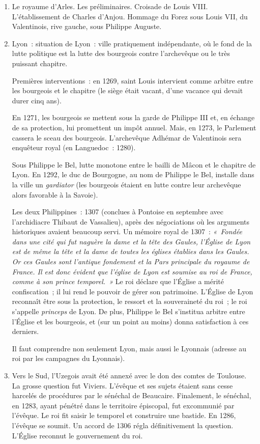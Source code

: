 \documentclass[french,twoside]{book} %
\begin{document}
\begin{enumerate}[itemsep=\baselineskip,]
\item Le royaume d’Arles. Les préliminaires. Croisade de Louis VIII. L’établissement de Charles d’Anjou. Hommage du Forez sous Louis VII, du Valentinois, rive gauche, sous Philippe Auguste.
\item  Lyon : situation de Lyon : ville pratiquement indépendante, où le fond de la lutte politique est la lutte des bourgeois contre l’archevêque ou le très puissant chapitre.\par
 Premières interventions : en 1269, saint Louis intervient comme arbitre entre les bourgeois et le chapitre (le siège était vacant, d’une vacance qui devait durer cinq ans).\par
 En 1271, les bourgeois se mettent sous la garde de Philippe III et, en échange de sa protection, lui promettent un impôt annuel. Mais, en 1273, le Parlement cassera le sceau des bourgeois. L’archevêque Adhémar de Valentinois sera enquêteur royal (en Languedoc : 1280).\par
 Sous Philippe le Bel, lutte monotone entre le bailli de Mâcon et le chapitre de Lyon. En 1292, le duc de Bourgogne, au nom de Philippe le Bel, installe dans la ville un {\itshape gardiator} (les bourgeois étaient en lutte contre leur archevêque alors favorable à la Savoie).\par
 Les deux Philippines : 1307 (conclues à Pontoise en septembre avec l’archidiacre Thibaut de Vassalieu), après des négociations où les arguments historiques avaient beaucoup servi. Un mémoire royal de 1307 : \emph{« Fondée dans une cité qui fut naguère la dame et la tête des Gaules, l’Église de Lyon est de même la tête et la dame de toutes les églises établies dans les Gaules. Or ces Gaules sont l’antique fondement et la {\itshape Pars} principale du royaume de France. Il est donc évident que l’église de Lyon est soumise au roi de France, comme à son prince temporel. »} Le roi déclare que l’Église a mérité confiscation ; il lui rend le pouvoir de gérer son patrimoine. L’Église de Lyon reconnaît être sous la protection, le ressort et la souveraineté du roi ; le roi s’appelle \emph{princeps} de Lyon. De plus,  
\label{p35} Philippe le Bel s’institua arbitre entre l’Église et les bourgeois, et (sur un point au moins) donna satisfaction à ces derniers.\par
 Il faut comprendre non seulement Lyon, mais aussi le Lyonnais (adresse au roi par les campagnes du Lyonnais).
 
\item  Vers le Sud, l’Uzegois avait été annexé avec le don des comtes de Toulouse. La grosse question fut Viviers. L’évêque et ses sujets étaient sans cesse harcelés de procédures par le sénéchal de Beaucaire. Finalement, le sénéchal, en 1283, ayant pénétré dans le territoire épiscopal, fut excommunié par l’évêque. Le roi fit saisir le temporel et construire une bastide. En 1286, l’évêque se soumit. Un accord de 1306 régla définitivement la question. L’Église reconnut le gouvernement du roi.\par
 

\end{enumerate}
\end{document}
